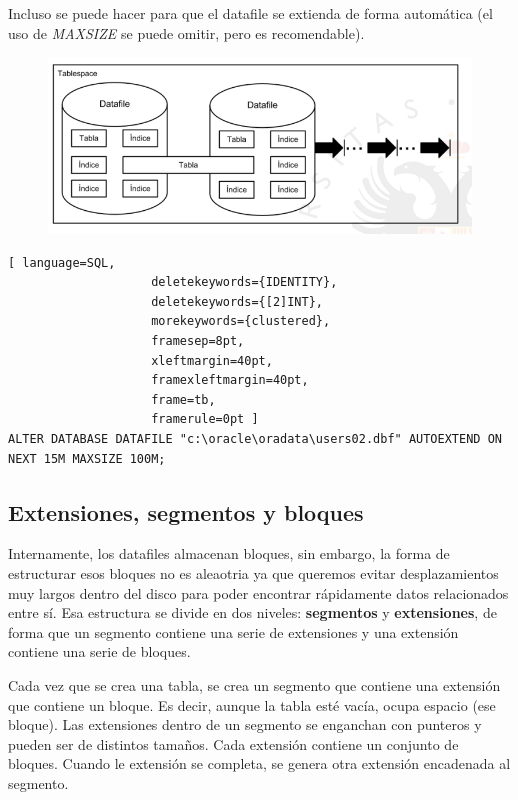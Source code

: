 Incluso se puede hacer para que el datafile se extienda de forma automática (el uso de \textit{MAXSIZE} se puede omitir, pero es recomendable).

\begin{figure}[H]
  \center
  \includegraphics[scale=0.4]{img/13.png}
\end{figure}
\begin{lstlisting}[ language=SQL,
                    deletekeywords={IDENTITY},
                    deletekeywords={[2]INT},
                    morekeywords={clustered},
                    framesep=8pt,
                    xleftmargin=40pt,
                    framexleftmargin=40pt,
                    frame=tb,
                    framerule=0pt ]
ALTER DATABASE DATAFILE "c:\oracle\oradata\users02.dbf" AUTOEXTEND ON NEXT 15M MAXSIZE 100M;
\end{lstlisting}

\subsection{Extensiones, segmentos y bloques}

Internamente, los datafiles almacenan bloques, sin embargo, la forma de estructurar esos bloques no es aleaotria ya que queremos evitar desplazamientos muy largos dentro del disco para poder encontrar rápidamente datos relacionados entre sí. Esa estructura se divide en dos niveles: \textbf{segmentos} y \textbf{extensiones}, de forma que un segmento contiene una serie de extensiones y una extensión contiene una serie de bloques.

Cada vez que se crea una tabla, se crea un segmento que contiene una extensión que contiene un bloque. Es decir, aunque la tabla esté vacía, ocupa espacio (ese bloque). Las extensiones dentro de un segmento se enganchan con punteros y pueden ser de distintos tamaños. Cada extensión contiene un conjunto de bloques. Cuando le extensión se completa, se genera otra extensión encadenada al segmento.

